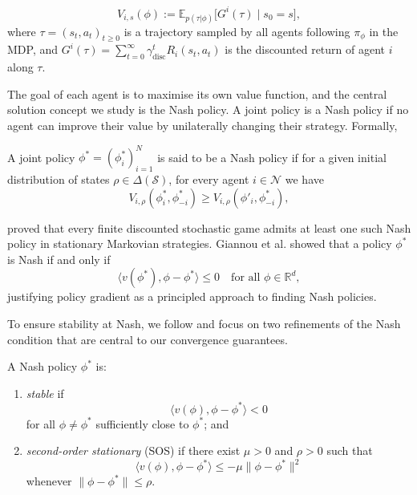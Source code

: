 \documentclass{nextgame2026} %
\begin{document}
\begin{equation}
  V_{i,s}(\phi) := \mathbb{E}_{p(\tau|\phi)}\bigl[G^i(\tau) \mid s_0 = s\bigr],
\end{equation}
where $\tau = (s_t, a_t)_{t \geq 0}$ is a trajectory sampled by all agents
following $\pi_\phi$ in the MDP, and $G^i(\tau) = \sum_{t=0}^{\infty}
\gamma^t_{\mathrm{disc}} R_i(s_t, a_t)$ is the discounted return of agent
$i$ along $\tau$.

The goal of each agent is to maximise its own value function, and the central solution concept we study is the Nash policy. A joint policy is a Nash policy if no agent can improve their value by unilaterally changing their strategy. Formally,

\begin{definition}
A joint policy $\phi^* = (\phi^*_i)_{i=1}^N$ is said to be a Nash policy if for a given initial distribution of states $\rho \in \Delta(\mathcal{S})$, for every agent $i \in \mathcal{N}$ we have
\begin{equation}
    V_{i,\rho}(\phi^*_i, \phi^*_{-i}) \geq V_{i,\rho}(\phi'_i, \phi^*_{-i}),
\end{equation}
\end{definition}

\citet{fink1964equilibrium} proved that every 
finite discounted stochastic game admits at least one such Nash policy 
in stationary Markovian strategies. Giannou et al. \citep{giannou2022convergence} showed that a policy $\phi^*$ is Nash if and only if
\begin{equation}
    \langle v(\phi^*), \phi - \phi^* \rangle \leq 0 
    \quad \text{for all } \phi \in \mathbb{R}^d, 
\end{equation}
justifying policy gradient as a principled approach to finding Nash policies.

To ensure stability at Nash, we follow \citet{giannou2022convergence} and focus on two refinements of the Nash condition that are central to our convergence guarantees.

\begin{definition}
A Nash policy $\phi^*$ is:
\begin{enumerate}[label=(\roman*)]
    \item \textit{stable} if
    \begin{equation}
        \langle v(\phi), \phi - \phi^* \rangle < 0
    \end{equation}
    for all $\phi \neq \phi^*$ sufficiently close to $\phi^*$; and
    \item \textit{second-order stationary} (SOS) if there exist 
    $\mu > 0$ and $\rho > 0$ such that
    \begin{equation}
        \langle v(\phi), \phi - \phi^* \rangle \leq -\mu \|\phi - \phi^*\|^2\label{eq:sos}
    \end{equation}
    whenever $\|\phi - \phi^*\| \leq \rho$.
\end{enumerate}
\end{definition}
\end{document}
